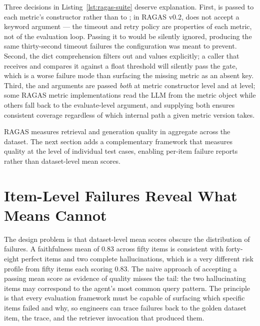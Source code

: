 Three decisions in Listing~\ref{lst:ragas-suite} deserve explanation.
First,  is passed to each metric's constructor rather than
to ; in RAGAS v0.2,  does not accept a
 keyword argument --- the timeout and retry policy are
properties of each metric, not of the evaluation loop.  Passing it to
 would be silently ignored, producing the same thirty-second
timeout failures the configuration was meant to prevent.  Second, the dict
comprehension filters out  and  values explicitly;
a caller that receives  and compares it against a float threshold
will silently pass the gate, which is a worse failure mode than surfacing the
missing metric as an absent key.  Third, the  and 
arguments are passed \emph{both} at metric constructor level and at
 level; some RAGAS metric implementations read the LLM from
the metric object while others fall back to the evaluate-level argument, and
supplying both ensures consistent coverage regardless of which internal path
a given metric version takes.

RAGAS measures retrieval and generation quality in aggregate across the
dataset.  The next section adds a complementary framework that measures
quality at the level of individual test cases, enabling per-item failure
reports rather than dataset-level mean scores.

\section{Item-Level Failures Reveal What Means Cannot}
\label{sec:deepeval-metrics}

The design problem is that dataset-level mean scores obscure the
distribution of failures.  A faithfulness mean of 0.83 across fifty items
is consistent with forty-eight perfect items and two complete hallucinations,
which is a very different risk profile from fifty items each scoring 0.83.
The naive approach of accepting a passing mean score as evidence of quality
misses the tail: the two hallucinating items may correspond to the agent's
most common query pattern.  The principle is that every evaluation framework
must be capable of surfacing which specific items failed and why, so
engineers can trace failures back to the golden dataset item, the trace, and
the retriever invocation that produced them.

